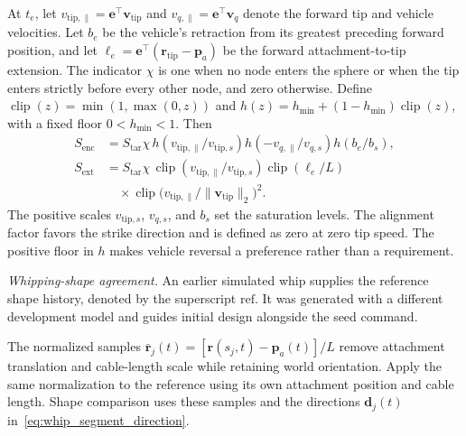 \documentclass[letterpaper, 10 pt, conference]{ieeeconf}
\begin{document}
At $t_e$, let $v_{\mathrm{tip},\parallel}=\mathbf e^\top\mathbf v_{\mathrm{tip}}$
and $v_{q,\parallel}=\mathbf e^\top\mathbf v_q$ denote the forward
tip and vehicle velocities. Let $b_e$ be the vehicle's retraction
from its greatest preceding forward position, and let
$\ell_e=\mathbf e^\top(\mathbf r_{\mathrm{tip}}-\mathbf p_a)$
be the forward attachment-to-tip extension. The indicator $\chi$
is one when no node enters the sphere or when the tip enters
strictly before every other node, and zero otherwise.
Define $\operatorname{clip}(z)=\min(1,\max(0,z))$ and
$h(z)=h_{\min}+(1-h_{\min})\operatorname{clip}(z)$, with a fixed
floor $0<h_{\min}<1$. Then
\begin{equation}
\begin{aligned}
S_{\mathrm{enc}}
&=S_{\mathrm{tar}}\chi\,h(v_{\mathrm{tip},\parallel}/v_{\mathrm{tip},s})
h(-v_{q,\parallel}/v_{q,s})h(b_e/b_s),\\
S_{\mathrm{ext}}
&=S_{\mathrm{tar}}\chi\,\operatorname{clip}(v_{\mathrm{tip},\parallel}/v_{\mathrm{tip},s})
\operatorname{clip}(\ell_e/L)\\
&\quad\times\operatorname{clip}\!\bigl(
v_{\mathrm{tip},\parallel}/\|\mathbf v_{\mathrm{tip}}\|_2\bigr)^2.
\end{aligned}
\label{eq:directed_motion_scores}
\end{equation}
The positive scales $v_{\mathrm{tip},s}$, $v_{q,s}$, and $b_s$
set the saturation levels. The alignment factor favors the strike
direction and is defined as zero at zero tip speed. The positive
floor in $h$ makes vehicle reversal a preference rather than a
requirement.

\noindent\emph{Whipping-shape agreement.}
An earlier simulated whip supplies the reference shape history,
denoted by the superscript $\mathrm{ref}$. It was generated with a
different development model and guides initial design alongside
the seed command.

The normalized samples
$\bar{\mathbf r}_j(t)=[\mathbf r(s_j,t)-\mathbf p_a(t)]/L$
remove attachment translation and cable-length scale while
retaining world orientation. Apply the same normalization to the
reference using its own attachment position and cable length.
Shape comparison uses these samples and the directions
$\mathbf d_j(t)$ in~\eqref{eq:whip_segment_direction}.
\end{document}
